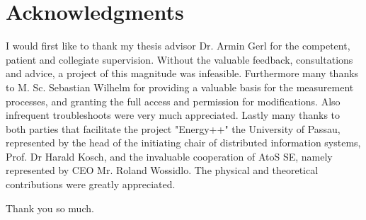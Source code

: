 \chapter*{Acknowledgments}

I would first like to thank my thesis advisor Dr. Armin Gerl for the competent, patient and collegiate supervision. Without the valuable feedback, consultations and advice, a project of this magnitude was infeasible.
Furthermore many thanks to M. Sc. Sebastian Wilhelm for providing a valuable basis for the measurement processes, and granting the full access and permission for modifications. Also infrequent troubleshoots were very much appreciated.
Lastly many thanks to both parties that facilitate the project "Energy++" the University of Passau, represented by the head of the initiating chair of distributed information systems, Prof. Dr Harald Kosch, and the invaluable cooperation of AtoS SE, namely represented by CEO Mr. Roland Wossidlo. The physical and theoretical contributions were greatly appreciated.

Thank you so much.